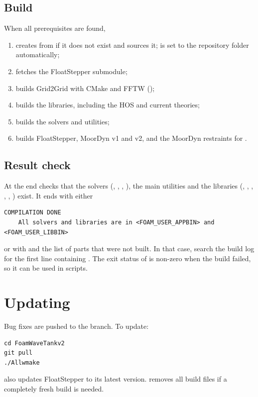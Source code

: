 \subsection{Build}
When all prerequisites are found, 
\begin{enumerate}
  \item creates  from  if it does not exist and sources
        it;  is set to the repository folder automatically;
  \item fetches the FloatStepper submodule;
  \item builds Grid2Grid with CMake and FFTW ();
  \item builds the \wtwof{} libraries, including the HOS and current theories;
  \item builds the solvers and utilities;
  \item builds FloatStepper, MoorDyn v1 and v2, and the MoorDyn restraints for
        .
\end{enumerate}

\subsection{Result check}
At the end  checks that the solvers (, ,
, ), the main utilities and the libraries
(, , , ,
, ) exist. It ends with either
\begin{lstlisting}[style=shell]
COMPILATION DONE
    All solvers and libraries are in <FOAM_USER_APPBIN> and <FOAM_USER_LIBBIN>
\end{lstlisting}
or with  and the list of parts that were not built. In that case,
search the build log for the first line containing . The exit status of
 is non-zero when the build failed, so it can be used in scripts.

\section{Updating}
Bug fixes are pushed to the  branch. To update:
\begin{lstlisting}[style=shell,caption={Updating an existing installation.}]
cd FoamWaveTankv2
git pull
./Allwmake
\end{lstlisting}
 also updates FloatStepper to its latest version.  removes all
build files if a completely fresh build is needed.

